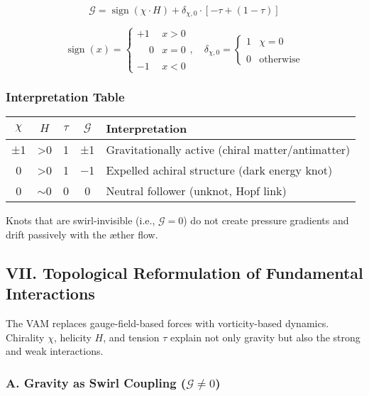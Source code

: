 \[
\boxed{
\mathcal{G} = \operatorname{sign}(\chi \cdot H)
+ \delta_{\chi, 0} \cdot \left[ -\tau + (1 - \tau) \right]
}
\]

\[
\operatorname{sign}(x) =
\begin{cases}
+1 & x > 0 \\\\
\phantom{+}0 & x = 0 \\\\
-1 & x < 0
\end{cases},
\quad
\delta_{\chi, 0} =
\begin{cases}
1 & \chi = 0 \\\\
0 & \text{otherwise}
\end{cases}
\]

\subsubsection*{Interpretation Table}

\begin{center}
\begin{tabular}{|c|c|c|c|l|}
\hline
$\chi$ & $H$ & $\tau$ & $\mathcal{G}$ & Interpretation \\\hline
±1 & >0 & 1 & ±1 & Gravitationally active (chiral matter/antimatter) \\\hline
0 & >0 & 1 & −1 & Expelled achiral structure (dark energy knot) \\\hline
0 & $\sim$0 & 0 & 0 & Neutral follower (unknot, Hopf link) \\\hline
\end{tabular}
\end{center}

Knots that are swirl-invisible (i.e., $\mathcal{G} = 0$) do not create pressure gradients and drift passively with the æther flow.

\subsection*{VII. Topological Reformulation of Fundamental Interactions}

The VAM replaces gauge-field-based forces with vorticity-based dynamics. Chirality $\chi$, helicity $H$, and tension $\tau$ explain not only gravity but also the strong and weak interactions.

\subsubsection*{A. Gravity as Swirl Coupling ($\mathcal{G} \ne 0$)}

